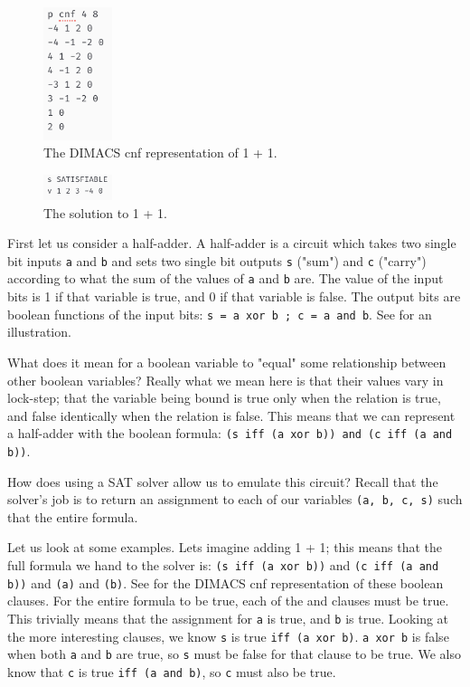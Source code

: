 \begin{figure}[t]
    \centerline{\includegraphics[origin=c,width=2cm]{fig_one_plus_one_cnf}}
    \caption{The DIMACS cnf representation of 1 + 1.}%
    \label{fig:one_plus_one_cnf}%
\end{figure}

\begin{figure}[t]
    \centerline{\includegraphics[origin=c,width=2cm]{fig_one_plus_one_sol}}
    \caption{The solution to 1 + 1.}%
    \label{fig:one_plus_one_sol}%
\end{figure}

First let us consider a half-adder. A half-adder is a circuit which takes two single bit inputs \texttt{a} and \texttt{b} and sets two single bit outputs \texttt{s} ("sum") and \texttt{c} ("carry") according to what the sum of the values of \texttt{a} and \texttt{b} are. The value of the input bits is 1 if that variable is true, and 0 if that variable is false. The output bits are boolean functions of the input bits: \texttt{s = a xor b ; c = a and b}. See  for an illustration.

What does it mean for a boolean variable to "equal" some relationship between other boolean variables? Really what we mean here is that their values vary in lock-step; that the variable being bound is true only when the relation is true, and false identically when the relation is false. This means that we can represent a half-adder with the boolean formula:
\texttt{(s iff (a xor b)) and (c iff (a and b))}.

How does using a SAT solver allow us to emulate this circuit? Recall that the solver's job is to return an assignment to each of our variables \texttt{(a, b, c, s)} such that the entire formula.

Let us look at some examples. Lets imagine adding 1 + 1; this means that the full formula we hand to the solver is:
\texttt{(s iff (a xor b))} and \texttt{(c iff (a and b))} and \texttt{(a)} and \texttt{(b)}. See  for the DIMACS cnf representation of these boolean clauses.
For the entire formula to be true, each of the and clauses must be true. This trivially means that the assignment for \texttt{a} is true, and \texttt{b} is true. Looking at the more interesting clauses, we know \texttt{s} is true \texttt{iff (a xor b)}. \texttt{a xor b} is false when both \texttt{a} and \texttt{b} are true, so \texttt{s} must be false for that clause to be true. We also know that \texttt{c} is true \texttt{iff (a and b)}, so \texttt{c} must also be true.

